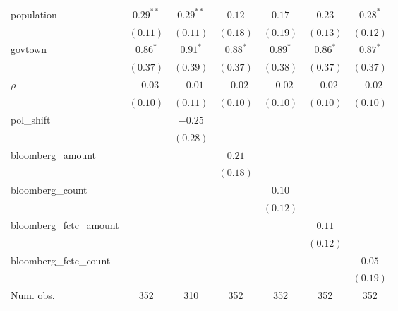 \begin{table}[!h]
\begin{center}
\begin{tabular}{l c c c c c c }
population              & $0.29^{**}$  & $0.29^{**}$  & $0.12$       & $0.17$       & $0.23$       & $0.28^{*}$   \\
                        & $(0.11)$     & $(0.11)$     & $(0.18)$     & $(0.19)$     & $(0.13)$     & $(0.12)$     \\
govtown                 & $0.86^{*}$   & $0.91^{*}$   & $0.88^{*}$   & $0.89^{*}$   & $0.86^{*}$   & $0.87^{*}$   \\
                        & $(0.37)$     & $(0.39)$     & $(0.37)$     & $(0.38)$     & $(0.37)$     & $(0.37)$     \\
$\rho$                  & $-0.03$      & $-0.01$      & $-0.02$      & $-0.02$      & $-0.02$      & $-0.02$      \\
                        & $(0.10)$     & $(0.11)$     & $(0.10)$     & $(0.10)$     & $(0.10)$     & $(0.10)$     \\
pol\_shift              &              & $-0.25$      &              &              &              &              \\
                        &              & $(0.28)$     &              &              &              &              \\
bloomberg\_amount       &              &              & $0.21$       &              &              &              \\
                        &              &              & $(0.18)$     &              &              &              \\
bloomberg\_count        &              &              &              & $0.10$       &              &              \\
                        &              &              &              & $(0.12)$     &              &              \\
bloomberg\_fctc\_amount &              &              &              &              & $0.11$       &              \\
                        &              &              &              &              & $(0.12)$     &              \\
bloomberg\_fctc\_count  &              &              &              &              &              & $0.05$       \\
                        &              &              &              &              &              & $(0.19)$     \\
\midrule
Num. obs.               & 352          & 310          & 352          & 352          & 352          & 352          \\

\end{tabular}
\end{center}
\end{table}
